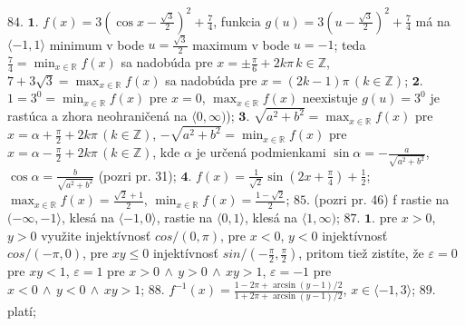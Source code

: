  $\boxed{84.}$
$\boldsymbol{1.}$
$ f(x)=3(\cos x - \frac{\sqrt{3}}{2})^{2}+ \frac{7}{4} $, funkcia $ g(u)=3(u - \frac{\sqrt{3}}{2})^{2}+ \frac{7}{4} $ má na $ \langle-1,1\rangle $ minimum v bode $u =\frac{\sqrt{3}}{2} $ maximum v bode $ u=-1 $; teda $ \frac{7}{4}= \min_{x\in \mathbb{R}} f(x) $ sa nadobúda pre $ x=\pm \frac{\pi}{6}+2k \pi \, k\in \mathbb{Z} $, $ 7+3\sqrt{3}= \max_{x\in \mathbb{R}} f(x) $ sa nadobúda pre $ x=(2k-1)\pi \, (k\in \mathbb{Z}) $; 
$\boldsymbol{2.}$
$ 1=3^{0}=\min_{x\in \mathbb{R}} f(x) $ pre $ x=0 $, $ \max_{x\in \mathbb{R}} f(x) $ neexistuje $ g(u)=3^{0} $ je rastúca a zhora neohraničená na $ \langle0,\infty) $);
$\boldsymbol{3.}$
$ \sqrt{a^{2}+b^{2}}=\max_{x\in \mathbb{R}}f(x) $ pre $ x=\alpha + \frac{\pi}{2}+2k \pi \, (k\in \mathbb{Z}) $, $ -\sqrt{a^{2}+b^{2}}=\min_{x\in \mathbb{R}}f(x) $ pre $ x=\alpha - \frac{\pi}{2}+2k \pi \, (k\in \mathbb{Z}) $, kde $ \alpha $ je určená podmienkami $ \sin \alpha = - \frac{a}{\sqrt{a^{2}+b^{2}}} $, $ \cos \alpha =  \frac{b}{\sqrt{a^{2}+b^{2}}} $ (pozri pr. 31);
$\boldsymbol{4.}$
$ f(x)=\frac{1}{\sqrt{2}} \sin (2x+\frac{\pi}{4})+\frac{1}{2} $; $ \max_{x\in \mathbb{R}}f(x)= \frac{\sqrt{2}+1}{2} $, $ \min_{x\in \mathbb{R}}f(x)=\frac{1-\sqrt{2}}{2} $;
$\boxed{85.}$
(pozri pr. 46) f rastie na $ (-\infty,-1\rangle $, klesá na $ \langle-1,0\rangle $, rastie na $ \langle0,1\rangle $, klesá na $ \langle1,\infty) $;
$\boxed{87.}$
$\boldsymbol{1.}$
pre $ x>0 $, $ y>0 $ využite injektívnosť $ cos/(0,\pi) $, pre $ x<0 $, $ y<0 $ injektívnosť $ cos/(-\pi,0) $, pre $ xy\leq 0 $ injektívnosť $ sin/(-\frac{\pi}{2},\frac{\pi}{2}) $, pritom tiež zistíte, že $ \varepsilon =0 $ pre $ xy<1 $, $ \varepsilon =1 $ pre $x>0 \, \land \, y > 0 \, \land \, xy>1 $, $ \varepsilon =-1 $ pre $x<0 \, \land \, y < 0 \, \land \, xy>1 $;
$\boxed{88.}$
$ f^{-1}(x)=\frac{1-2\pi+\arcsin(y-1)/2}{1+2\pi+\arcsin(y-1)/2} $, $ x \in \langle-1,3\rangle $;
$\boxed{89.}$
platí;


